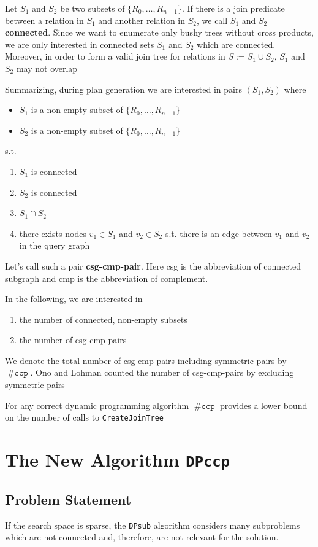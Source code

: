 \documentclass[11pt]{article}
\DeclareMathOperator{\nccp}{\#\texttt{ccp}}
\begin{document}
Let \(S_1\) and \(S_2\) be two subsets of \(\{R_0,\dots,R_{n-1}\}\). If there is a join predicate
between a relation in \(S_1\) and another relation in \(S_2\), we call \(S_1\) and \(S_2\) \textbf{connected}.
Since we want to enumerate only bushy trees without cross products, we are only interested in
connected sets \(S_1\) and \(S_2\) which are connected. Moreover, in order to form a valid join tree
for relations in \(S:=S_1\cup S_2\), \(S_1\) and \(S_2\) may not overlap

Summarizing, during plan generation we are interested in pairs \((S_1,S_2)\) where
\begin{itemize}
\item \(S_1\) is a non-empty subset of \(\{R_0,\dots,R_{n-1}\}\)
\item \(S_2\) is a non-empty subset of \(\{R_0,\dots,R_{n-1}\}\)
\end{itemize}
s.t.
\begin{enumerate}
\item \(S_1\) is connected
\item \(S_2\) is connected
\item \(S_1\cap S_2\)
\item there exists nodes \(v_1\in S_1\) and \(v_2\in S_2\) s.t. there is an edge between \(v_1\) and
\(v_2\) in the query graph
\end{enumerate}

Let's call such a pair \textbf{csg-cmp-pair}. Here csg is the abbreviation of connected subgraph and cmp is the
abbreviation of complement.

In the following, we are interested in
\begin{enumerate}
\item the number of connected, non-empty subsets
\item the number of csg-cmp-pairs
\end{enumerate}

We denote the total number of csg-cmp-pairs including symmetric pairs by \(\nccp\).
Ono and Lohman counted the number of csg-cmp-pairs by excluding symmetric pairs

For any correct dynamic programming algorithm \(\nccp\) provides a lower bound on the number of calls
to \texttt{CreateJoinTree}
\section{The New Algorithm \texttt{DPccp}}
\label{sec:org25399e6}
\subsection{Problem Statement}
\label{sec:orgdac8070}
If the search space is sparse, the \texttt{DPsub} algorithm considers many subproblems which are not connected
and, therefore, are not relevant for the solution.
\end{document}
